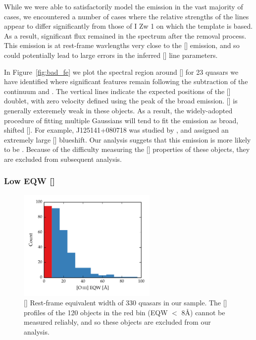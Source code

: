 While we were able to satisfactorily model the  emission in the vast majority of cases, we encountered a number of cases where the relative strengths of the  lines appear to differ significantly from those of I Zw 1 on which the  template is based. 
As a result, significant  flux remained in the spectrum after the removal process. 
This emission is at rest-frame wavlengths very close to the [] emission, and so could potentially lead to large errors in the inferred [] line parameters. 

In Figure~\ref{fig:bad_fe} we plot the spectral region around [] for 23 quasars we have identified where significant features remain following the subtraction of the continuum and . 
The vertical lines indicate the expected positions of the [] doublet, with zero velocity defined using the peak of the broad \hb emission. 
[] is generally exteremely weak in these objects. 
As a result, the widely-adopted procedure of fitting multiple Gaussians will tend to fit the  emission as broad, shifted []. 
For example, J125141+080718 was studied by \citet{shen16a}, and assigned an extremely large [] blueshift. 
Our analysis suggets that this emission is more likely to be . 
Because of the difficulty measuring the [] properties of these objects, they are excluded from subsequent analysis.  

\subsubsection{Low EQW []}

\begin{figure}
    \centering
    \includegraphics[width=0.6\textwidth]{figures/chapter04/oiii_eqw_hist.pdf} 
    \caption{[] Rest-frame equivalent width of 330 quasars in our sample. The [] profiles of the 120 objects in the red bin (EQW $<$ 8\AA) cannot be measured reliably, and so these objects are excluded from our analysis.}     
    \label{fig:oiii_strength_hist}
\end{figure}

